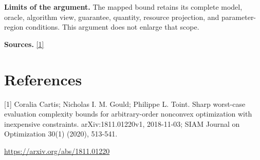 \documentclass[10pt,a4paper]{article}
\begin{document}
\textbf{Limits of the argument.} The mapped bound retains its complete model, oracle, algorithm view, guarantee, quantity, resource projection, and parameter-region conditions. This argument does not enlarge that scope.

\textbf{Sources.} \href{https://arxiv.org/abs/1811.01220}{[1]}

\section{References}
[1] Coralia Cartis; Nicholas I. M. Gould; Philippe L. Toint. Sharp worst-case evaluation complexity bounds for arbitrary-order nonconvex optimization with inexpensive constraints. arXiv:1811.01220v1, 2018-11-03; SIAM Journal on Optimization 30(1) (2020), 513-541.

\url{https://arxiv.org/abs/1811.01220}
\end{document}
